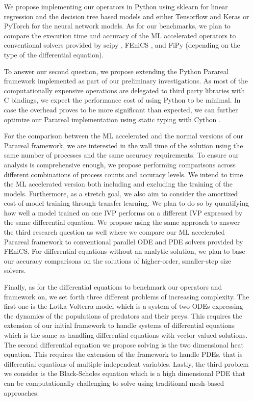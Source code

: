 \documentclass{article}
\begin{document}
We propose implementing our operators in Python using sklearn for linear regression and the decision tree based models and either Tensorflow \cite{mart2015} and Keras \cite{chollet2015} or PyTorch \cite{paszke2019} for the neural network models. As for our benchmarks, we plan to compare the execution time and accuracy of the ML accelerated operators to conventional solvers provided by scipy \cite{scipy2020}, FEniCS \cite{fenics2015}, and FiPy \cite{fipy2009} (depending on the type of the differential equation).

To answer our second question, we propose extending the Python Parareal framework implemented as part of our preliminary investigations. As most of the computationally expensive operations are delegated to third party libraries with C bindings, we expect the performance cost of using Python to be minimal. In case the overhead proves to be more significant than expected, we can further optimize our Parareal implementation using static typing with Cython \cite{behnel2010}.

For the comparison between the ML accelerated and the normal versions of our Parareal framework, we are interested in the wall time of the solution using the same number of processes and the same accuracy requirements. To ensure our analysis is comprehensive enough, we propose performing comparisons across different combinations of process counts and accuracy levels. We intend to time the ML accelerated version both including and excluding the training of the models. Furthermore, as a stretch goal, we also aim to consider the amortized cost of model training through transfer learning. We plan to do so by quantifying how well a model trained on one IVP performs on a different IVP expressed by the same differential equation. We propose using the same approach to answer the third research question as well where we compare our ML accelerated Parareal framework to conventional parallel ODE and PDE solvers provided by FEniCS. For differential equations without an analytic solution, we plan to base our accuracy comparisons on the solutions of higher-order, smaller-step size solvers.

Finally, as for the differential equations to benchmark our operators and framework on, we set forth three different problems of increasing complexity. The first one is the Lotka-Volterra model \cite{lotka1926} which is a system of two ODEs expressing the dynamics of the populations of predators and their preys. This requires the extension of our initial framework to handle systems of differential equations which is the same as handling differential equations with vector valued solutions. The second differential equation we propose solving is the two dimensional heat equation. This requires the extension of the framework to handle PDEs, that is differential equations of multiple independent variables. Lastly, the third problem we consider is the Black-Scholes equation \cite{black1973} which is a high dimensional PDE that can be computationally challenging to solve using traditional mesh-based approaches.
\end{document}
